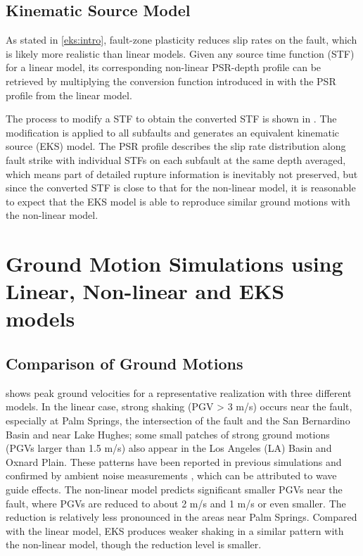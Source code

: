 \subsection{Kinematic Source Model}
As stated in \cref{eks:intro}, fault-zone plasticity reduces slip rates on the fault, which is likely more realistic than linear models. Given any source time function (STF) for a linear model, its corresponding non-linear PSR-depth profile can be retrieved by multiplying the conversion function introduced in  with the PSR profile from the linear model. 

The process to modify a STF to obtain the converted STF is shown in . The modification is applied to all subfaults and generates an equivalent kinematic source (EKS) model. The PSR profile describes the slip rate distribution along fault strike with individual STFs on each subfault at the same depth averaged, which means part of detailed rupture information is inevitably not preserved, but since the converted STF is close to that for the non-linear model, it is reasonable to expect that the EKS model is able to reproduce similar ground motions with the non-linear model.

\section{Ground Motion Simulations using Linear, Non-linear and EKS models}

\subsection{Comparison of Ground Motions}
 shows peak ground velocities for a representative realization with three different models. In the linear case, strong shaking (PGV > 3 m/s) occurs near the fault, especially at Palm Springs, the intersection of the fault and the San Bernardino Basin and near Lake Hughes; some small patches of strong ground motions (PGVs larger than 1.5 m/s) also appear in the Los Angeles (LA) Basin and Oxnard Plain. These patterns have been reported in previous simulations \citep{olsen2009shakeout} and confirmed by ambient noise measurements \citep{denolle2014strong}, which can be attributed to wave guide effects. The non-linear model predicts significant smaller PGVs near the fault, where PGVs are reduced to about 2 m/s and 1 m/s or even smaller. The reduction is relatively less pronounced in the areas near Palm Springs. Compared with the linear model, EKS produces weaker shaking in a similar pattern with the non-linear model, though the reduction level is smaller.


